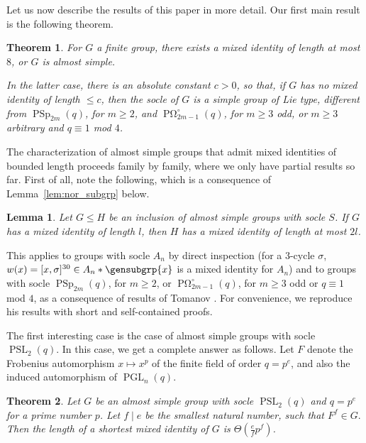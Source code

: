 \documentclass[a4paper,11pt]{amsproc}
\DeclareMathOperator{\PSp}{PSp}%
\DeclareMathOperator{\POmega}{P\Omega}
\DeclareMathOperator{\PSL}{PSL}%
\DeclareMathOperator{\PGL}{PGL}%
\theoremstyle{plain}
\newtheorem{theorem}{Theorem}
\newtheorem{lemma}{Lemma}[section]
\theoremstyle{definition}
\begin{document}
	Let us now describe the results of this paper in more detail.
	Our first main result is the following theorem.
	
	\begin{theorem}\label{thm:red_almst_smpl_grp}
		For $G$ a finite group, there exists a mixed identity of length at most $8$, or $G$ is almost simple. 
		
		In the latter case, there is an absolute constant $c>0$, so that, if $G$ has no mixed identity of length $\leq c$, then the socle of $G$ is a simple group of Lie type, different from $\PSp_{2m}(q)$, for $m \geq 2$, and $\POmega^\circ_{2m-1}(q)$, for $m\geq 3$ odd, or $m\geq 3$ arbitrary and $q\equiv 1$ mod $4$. 
	\end{theorem}
	
	The characterization of almost simple groups that admit mixed identities of bounded length proceeds family by family, where we only have partial results so far. First of all, note the following, which is a consequence of Lemma~\ref{lem:nor_subgrp} below.
	
	\begin{lemma}\label{lem:nor_subgrp2}
		Let $G\leq H$ be an inclusion of almost simple groups with  socle $S$. If $G$ has a  mixed identity of length $l$, then $H$ has a mixed identity of length at most $2l$.
	\end{lemma}
	
	This applies to groups with socle $A_n$ by direct inspection (for a $3$-cycle $\sigma$, $w(x)= [x,\sigma]^{30}\in A_n\ast\gensubgrp{x}$ is a mixed identity for $A_n$) \label{fct:bd_ids_alt_grps} and to groups with socle $\PSp_{2m}(q)$, for $m \geq 2$, or $\POmega^{\circ}_{2m-1}(q)$, for $m \geq 3$ odd or $q \equiv 1$ mod $4$, as a consequence of results of Tomanov \cite{tomanov1985generalized}. For convenience, we reproduce his results with short and self-contained proofs.
	
	The first interesting case is the case of almost simple groups with socle $\PSL_2(q).$ In this case, we get a complete answer as follows. 
	Let $F$ denote the Frobenius automorphism 
	$x \mapsto x^p$ of the finite field of order 
	$q=p^e$, and also the induced automorphism 
	of $\PGL_n(q)$.
	
	\begin{theorem} \label{thm:psl2}
		Let $G$ be an almost simple group with socle $\PSL_2(q)$ and $q=p^e$ for a prime number $p$. Let $f\mid e$ be the smallest natural number, such that $F^f \in G.$ Then the length of a shortest mixed identity of $G$ is $\Theta(\frac{e}{f} p^f)$.
	\end{theorem}
	
\end{document}

